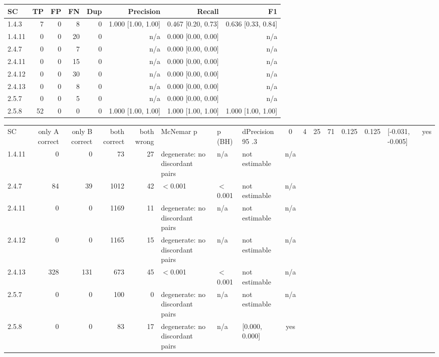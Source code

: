 \begin{tabular}{lrrrrrrr}
\hline
SC & TP & FP & FN & Dup & Precision & Recall & F1 \\
\hline
1.4.3 & 7 & 0 & 8 & 0 & 1.000 [1.00, 1.00] & 0.467 [0.20, 0.73] & 0.636 [0.33, 0.84] \\
1.4.11 & 0 & 0 & 20 & 0 & n/a & 0.000 [0.00, 0.00] & n/a \\
2.4.7 & 0 & 0 & 7 & 0 & n/a & 0.000 [0.00, 0.00] & n/a \\
2.4.11 & 0 & 0 & 15 & 0 & n/a & 0.000 [0.00, 0.00] & n/a \\
2.4.12 & 0 & 0 & 30 & 0 & n/a & 0.000 [0.00, 0.00] & n/a \\
2.4.13 & 0 & 0 & 8 & 0 & n/a & 0.000 [0.00, 0.00] & n/a \\
2.5.7 & 0 & 0 & 5 & 0 & n/a & 0.000 [0.00, 0.00] & n/a \\
2.5.8 & 52 & 0 & 0 & 0 & 1.000 [1.00, 1.00] & 1.000 [1.00, 1.00] & 1.000 [1.00, 1.00] \\
\hline
\end{tabular}

\begin{tabular}{lrrrrlllc}
\hline
SC & only A correct & only B correct & both correct & both wrong & McNemar p & p (BH) & dPrecision 95%
.3 & 0 & 4 & 25 & 71 & 0.125 & 0.125 & [-0.031, -0.005] & yes \\
1.4.11 & 0 & 0 & 73 & 27 & degenerate: no discordant pairs & n/a & not estimable & n/a \\
2.4.7 & 84 & 39 & 1012 & 42 & $<$0.001 & $<$0.001 & not estimable & n/a \\
2.4.11 & 0 & 0 & 1169 & 11 & degenerate: no discordant pairs & n/a & not estimable & n/a \\
2.4.12 & 0 & 0 & 1165 & 15 & degenerate: no discordant pairs & n/a & not estimable & n/a \\
2.4.13 & 328 & 131 & 673 & 45 & $<$0.001 & $<$0.001 & not estimable & n/a \\
2.5.7 & 0 & 0 & 100 & 0 & degenerate: no discordant pairs & n/a & not estimable & n/a \\
2.5.8 & 0 & 0 & 83 & 17 & degenerate: no discordant pairs & n/a & [0.000, 0.000] & yes \\
\hline
\end{tabular}

